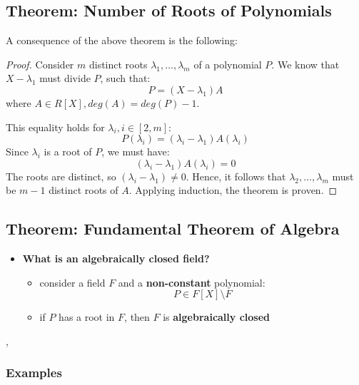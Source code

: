 \documentclass{exam}
\begin{document}
\subsection{Theorem: Number of Roots of Polynomials}

A consequence of the above theorem is the following:


\begin{proof}

Consider $m$ distinct roots $\lambda_1, \ldots, \lambda_m$ of a polynomial $P$. We know that $X - \lambda_1$ must divide $P$, such that:
\[
P = (X - \lambda_1)A
\]
where $A \in R[X], deg(A) = deg(P) - 1$.

\bigskip

This equality holds for $\lambda_i, i \in [2,m]$:
\[
P(\lambda_i) = (\lambda_i - \lambda_1)A(\lambda_i)
\]
Since $\lambda_i$ is a root of $P$, we must have:
\[
(\lambda_i - \lambda_1)A(\lambda_i) = 0
\]
The roots are distinct, so $(\lambda_i - \lambda_1) \neq 0$. Hence, it follows that $\lambda_2, \ldots, \lambda_m$ must be $m - 1$ distinct roots of $A$. Applying induction, the theorem is proven.

\end{proof}

\subsection{Theorem: Fundamental Theorem of Algebra}

\begin{itemize}
    \item \textbf{What is an algebraically closed field?}
    \begin{itemize}
        \item consider a field $F$ and a \textbf{non-constant} polynomial:
        \[
        P \in F[X] \setminus F
        \]
        \item if $P$ has a root in $F$, then $F$ is \textbf{algebraically closed}
    \end{itemize}
\end{itemize}

\sep


\subsubsection{Examples}
\end{document}
